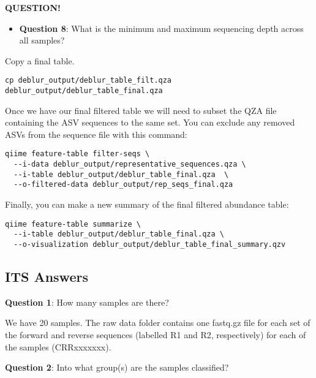 \documentclass[
]{book}
\providecommand{\tightlist}{%
  \setlength{\itemsep}{0pt}\setlength{\parskip}{0pt}}
\newenvironment{bluebox}{
  \definecolor{shadecolor}{RGB}{172, 210, 237}
  \color{white}
  \begin{shaded}}
 {\end{shaded}}
\begin{document}
\begin{bluebox}

\begin{center}
\textbf{QUESTION!}

\end{center}

\begin{itemize}
\tightlist
\item
  \textbf{Question 8}: What is the minimum and maximum sequencing depth across all samples?
\end{itemize}

\end{bluebox}

Copy a final table.

\begin{verbatim}
cp deblur_output/deblur_table_filt.qza deblur_output/deblur_table_final.qza
\end{verbatim}

Once we have our final filtered table we will need to subset the QZA file containing the ASV sequences to the same set. You can exclude any removed ASVs from the sequence file with this command:

\begin{verbatim}
qiime feature-table filter-seqs \
  --i-data deblur_output/representative_sequences.qza \
  --i-table deblur_output/deblur_table_final.qza  \
  --o-filtered-data deblur_output/rep_seqs_final.qza
\end{verbatim}

Finally, you can make a new summary of the final filtered abundance table:

\begin{verbatim}
qiime feature-table summarize \
  --i-table deblur_output/deblur_table_final.qza \
  --o-visualization deblur_output/deblur_table_final_summary.qzv
\end{verbatim}

\subsection{ITS Answers}\label{its-answers}

\textbf{Question 1}: How many samples are there?

We have 20 samples. The raw data folder contains one fastq.gz file for each set of the forward and reverse sequences (labelled R1 and R2, respectively) for each of the samples (CRRxxxxxxx).

\textbf{Question 2}: Into what group(s) are the samples classified?
\end{document}

